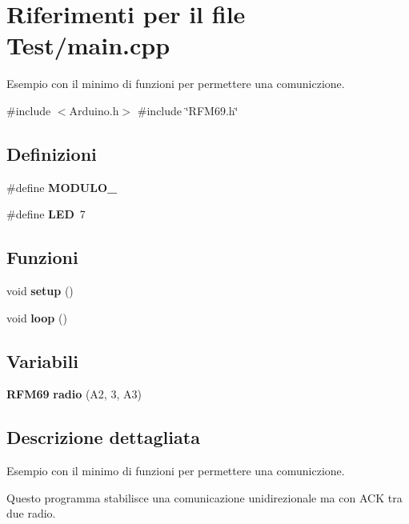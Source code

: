 \section{Riferimenti per il file Test/main.cpp}
\label{_r_f_m69_2_test_2main_8cpp}


Esempio con il minimo di funzioni per permettere una comuniczione.  


{\ttfamily \#include $<$Arduino.\+h$>$}\newline
{\ttfamily \#include \char`\"{}R\+F\+M69.\+h\char`\"{}}\newline
\subsection*{Definizioni}
\begin{DoxyCompactItemize}
\item 
\mbox{\label{_r_f_m69_2_test_2main_8cpp_af9b210b522e823b8f560622e848af827}} 
\#define {\bfseries M\+O\+D\+U\+L\+O\+\_}
\item 
\mbox{\label{_r_f_m69_2_test_2main_8cpp_aeb7a7ba1ab7e0406f1b5ab36d579f585}} 
\#define {\bfseries L\+ED}~7
\end{DoxyCompactItemize}
\subsection*{Funzioni}
\begin{DoxyCompactItemize}
\item 
\mbox{\label{_r_f_m69_2_test_2main_8cpp_a4fc01d736fe50cf5b977f755b675f11d}} 
void {\bfseries setup} ()
\item 
\mbox{\label{_r_f_m69_2_test_2main_8cpp_afe461d27b9c48d5921c00d521181f12f}} 
void {\bfseries loop} ()
\end{DoxyCompactItemize}
\subsection*{Variabili}
\begin{DoxyCompactItemize}
\item 
\mbox{\label{_r_f_m69_2_test_2main_8cpp_a4801927c117e14f77944af1e13348ffe}} 
\textbf{ R\+F\+M69} {\bfseries radio} (A2, 3, A3)
\end{DoxyCompactItemize}


\subsection{Descrizione dettagliata}
Esempio con il minimo di funzioni per permettere una comuniczione. 

Questo programma stabilisce una comunicazione unidirezionale ma con A\+CK tra due radio. 